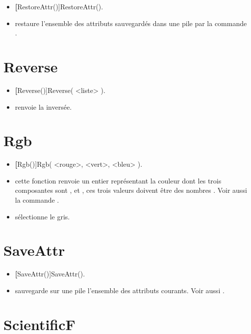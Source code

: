 \begin{itemize}
 \item \util \textbf[RestoreAttr()]{RestoreAttr()}.
 \item \desc restaure l'ensemble des attributs sauvegardés dans une pile par la commande . 
\end{itemize}


\section{Reverse}\label{cmdReverse}
\begin{itemize}
 \item \util \textbf[Reverse()]{Reverse( <liste> )}.
 \item \desc renvoie la  inversée.
\end{itemize}

\section{Rgb}\label{cmdRgb}

\begin{itemize}
 \item \util \textbf[Rgb()]{Rgb( <rouge>, <vert>, <bleu> )}.
 \item \desc cette fonction renvoie un entier représentant la couleur dont les trois composantes sont ,  et , ces trois valeurs doivent être des nombres . Voir aussi la commande .
 \item \exem {} sélectionne le gris.
\end{itemize}

\section{SaveAttr}\label{cmdSaveAttr}

\begin{itemize}
 \item \util \textbf[SaveAttr()]{SaveAttr()}.
 \item \desc sauvegarde sur une pile l'ensemble des attributs courants. Voir aussi .
\end{itemize}

\section{ScientificF}\label{cmdScientificF}

